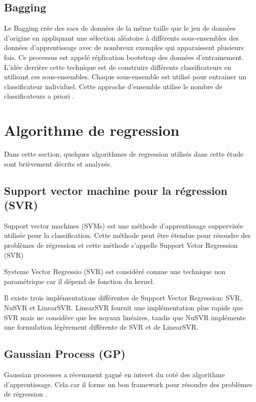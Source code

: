 \subsection{Bagging}
Le Bagging \cite{ML35} crée des sacs de données de la même taille que le jeu de données d'origine en appliquant une sélection aléatoire à différents sous-ensembles des données d'apprentissage avec de nombreux exemples qui apparaissent plusieurs fois. Ce processus est appelé réplication bootstrap des données d'entrainement. L'idée derrière cette technique est de construire différents classificateurs en utilisant ces sous-ensembles. Chaque sous-ensemble est utilisé pour entrainer un classificateur individuel. Cette approche d'ensemble utilise le nombre de classificateurs a priori \cite{ML35}.

\section{Algorithme de regression}
Dans cette section, quelques algorithmes de regression utilisés dans cette étude \cite{ML_UWB} sont brièvement décrits et analysés.

\subsection{Support vector machine pour la régression (SVR)}
Support vector machines (SVMs) est une méthode d'apprentissage suppervisée utilisée pour la classification. Cette méthode peut être étendue pour résoudre des problèmes de régression et cette méthode s'appelle Support Vetor Regression (SVR)

Systeme Vector Regressio (SVR) est considéré comme une technique non paramétrique car il dépend de fonction du kernel. 

Il existe trois implémentations différentes de Support Vector Regression: SVR, NuSVR et LinearSVR. LinearSVR fournit une implémentation plus rapide que SVR mais ne considère que les noyaux linéaires, tandis que NuSVR implémente une formulation légèrement différente de SVR et de LinearSVR.\cite{scikit}

\subsection{Gaussian Process (GP)}
Gaussian processes a récemment gagné en interet du coté des algorithme d'apprentissage. Cela car il forme un bon framework pour résoudre des problèmes de régression \cite{ML51}.

